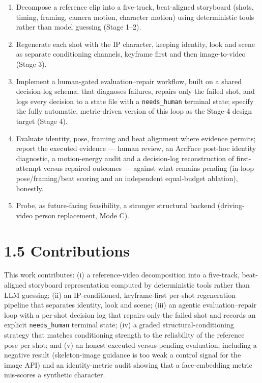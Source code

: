 \documentclass[10pt,twocolumn,letterpaper]{article}
\begin{document}
\begin{enumerate}[leftmargin=1.4em,itemsep=2pt,topsep=2pt]

\item Decompose a reference clip into a five-track, beat-aligned storyboard (shots, timing, framing, camera motion, character motion) using deterministic tools rather than model guessing (Stage 1--2).

\item Regenerate each shot with the IP character, keeping identity, look and scene as separate conditioning channels, keyframe first and then image-to-video (Stage 3).

\item Implement a human-gated evaluation--repair workflow, built on a shared decision-log schema, that diagnoses failures, repairs only the failed shot, and logs every decision to a state file with a \texttt{needs\_human} terminal state; specify the fully automatic, metric-driven version of this loop as the Stage-4 design target (Stage 4).

\item Evaluate identity, pose, framing and beat alignment where evidence permits; report the executed evidence --- human review, an ArcFace post-hoc identity diagnostic, a motion-energy audit and a decision-log reconstruction of first-attempt versus repaired outcomes --- against what remains pending (in-loop pose/framing/beat scoring and an independent equal-budget ablation), honestly.

\item Probe, as future-facing feasibility, a stronger structural backend (driving-video person replacement, Mode C).

\end{enumerate}


\section*{1.5 Contributions}

This work contributes: (i) a reference-video decomposition into a five-track, beat-aligned storyboard representation computed by deterministic tools rather than LLM guessing; (ii) an IP-conditioned, keyframe-first per-shot regeneration pipeline that separates identity, look and scene; (iii) an agentic evaluation--repair loop with a per-shot decision log that repairs only the failed shot and records an explicit \texttt{needs\_human} terminal state; (iv) a graded structural-conditioning strategy that matches conditioning strength to the reliability of the reference pose per shot; and (v) an honest executed-versus-pending evaluation, including a negative result (skeleton-image guidance is too weak a control signal for the image API) and an identity-metric audit showing that a face-embedding metric mis-scores a synthetic character.
\end{document}
